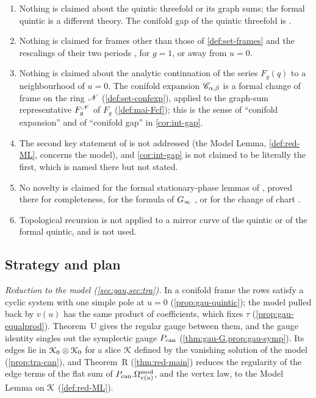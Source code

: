 \begin{enumerate}
\item Nothing is claimed about the quintic threefold or its graph sums; the formal quintic is a different theory. The conifold gap of the quintic threefold is \cite[Theorem~2]{CGYZ26}.
\item Nothing is claimed for frames other than those of \cref{def:set-frames} and the rescalings of their two periods , for $g=1$, or away from $u=0$.
\item Nothing is claimed about the analytic continuation of the series $F_g(q)$ to a neighbourhood of $u=0$. The conifold expansion $\mathscr{C}_{\alpha,\beta}$ is a formal change of frame on the ring $\mathscr{N}$ (\cref{def:set-confexp}), applied to the graph-sum representative $F_g^{\mathscr{N}}$ of $F_g$ (\cref{def:mai-Fcf}); this is the sense of ``conifold expansion'' and of ``conifold gap'' in \cref{cor:int-gap}.
\item The second key statement of \cite[Remark~1.9]{CGYZ26} is not addressed (the Model Lemma, \cref{def:red-ML}, concerns the model), and \cref{cor:int-gap} is not claimed to be literally the first, which is named there but not stated.
\item No novelty is claimed for the formal stationary-phase lemmas of , proved there for completeness, for the formula of $G_{\infty}$ \cite[Lemma~7.7, (37)]{GJR18}, or for the change of chart \cite[\S10]{MR1901075}.
\item Topological recursion is not applied to a mirror curve of the quintic or of the formal quintic, and \cite{FCCZ26} is not used.
\end{enumerate}

\subsection{Strategy and plan}
\label{sec:int-strategy}

\emph{Reduction to the model (\cref{sec:gau,sec:tra}).} In a conifold frame the rows satisfy a cyclic system with one simple pole at $u=0$ (\cref{prop:gau-quintic}); the model pulled back by $v(u)$ has the same product of coefficients, which fixes $\tau$ (\cref{prop:gau-equalprod}). Theorem~U gives the regular gauge between them, and the gauge identity singles out the symplectic gauge $P_{\mathrm{can}}$ (\cref{thm:gau-G,prop:gau-symp}). Its edges lie in $\mathcal{K}_{0}\otimes\mathcal{K}_{0}$ for a slice $\mathcal{K}$ defined by the vanishing solution of the model (\cref{prop:tra-can}), and Theorem~R (\cref{thm:red-main}) reduces the regularity of the edge terms of the flat sum of $P_{\mathrm{can}}.\Omega^{\mathrm{mod}}_{v(u)}$, and the vertex law, to the Model Lemma on $\mathcal{K}$ (\cref{def:red-ML}).

